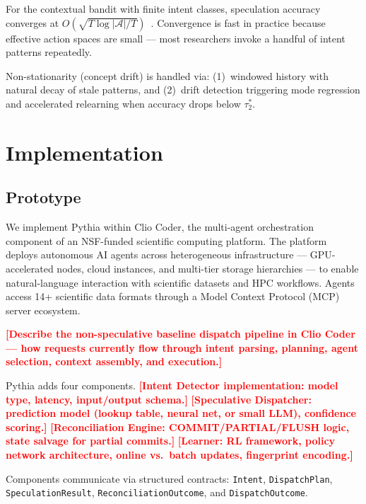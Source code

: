 \documentclass[conference,10pt]{IEEEtran}
\newcommand{\placeholder}[1]{\textcolor{red}{\textbf{[#1]}}}
\begin{document}
For the contextual bandit with finite intent classes, speculation accuracy converges at $O(\sqrt{T \log |\mathcal{A}| / T})$~\cite{agarwal2014taming}.
Convergence is fast in practice because effective action spaces are small --- most researchers invoke a handful of intent patterns repeatedly.

Non-stationarity (concept drift) is handled via: (1)~windowed history with natural decay of stale patterns, and (2)~drift detection triggering mode regression and accelerated relearning when accuracy drops below $\tau_2^*$.



\section{Implementation}
\label{sec:implementation}

\subsection{Prototype}

We implement Pythia within Clio Coder, the multi-agent orchestration component of an NSF-funded scientific computing platform.
The platform deploys autonomous AI agents across heterogeneous infrastructure --- GPU-accelerated nodes, cloud instances, and multi-tier storage hierarchies --- to enable natural-language interaction with scientific datasets and HPC workflows.
Agents access 14+ scientific data formats through a Model Context Protocol (MCP) server ecosystem.

\placeholder{Describe the non-speculative baseline dispatch pipeline in Clio Coder --- how requests currently flow through intent parsing, planning, agent selection, context assembly, and execution.}

Pythia adds four components. \placeholder{Intent Detector implementation: model type, latency, input/output schema.} \placeholder{Speculative Dispatcher: prediction model (lookup table, neural net, or small LLM), confidence scoring.} \placeholder{Reconciliation Engine: COMMIT/PARTIAL/FLUSH logic, state salvage for partial commits.} \placeholder{Learner: RL framework, policy network architecture, online vs.\ batch updates, fingerprint encoding.}

Components communicate via structured contracts: \texttt{Intent}, \texttt{DispatchPlan}, \texttt{SpeculationResult}, \texttt{ReconciliationOutcome}, and \texttt{DispatchOutcome}.
\end{document}
